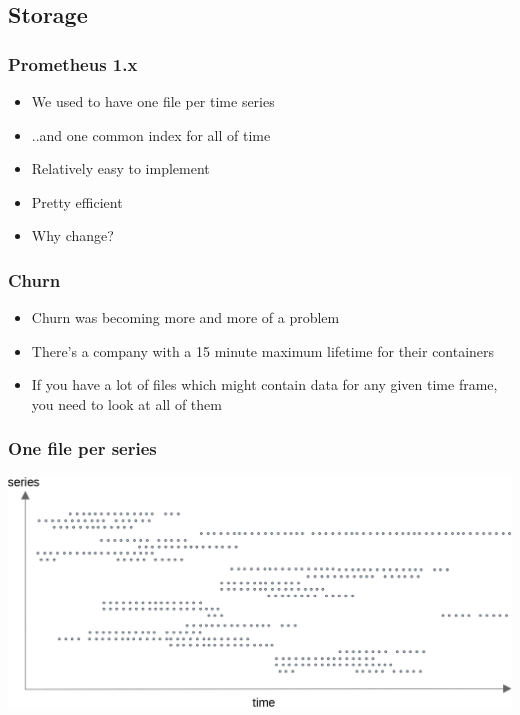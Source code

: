 \documentclass[aspectratio=169]{beamer}
\begin{document}
\subsection{Storage}

\begin{frame}
	\frametitle{Prometheus 1.x}
	\begin{itemize}
		\item We used to have one file per time series
		\item ..and one common index for all of time
		\item Relatively easy to implement
		\item Pretty efficient
		\item Why change?
	\end{itemize}
\end{frame}

\begin{frame}
	\frametitle{Churn}
	\begin{itemize}
		\item Churn was becoming more and more of a problem
		\item There's a company with a 15 minute maximum lifetime for their containers
		\item If you have a lot of files which might contain data for any given time frame, you need to look at all of them
	\end{itemize}
\end{frame}


\begin{frame}
	\frametitle{One file per series}
	\includegraphics[width=\textwidth]{storage--file_per_series.png}
\end{frame}
\end{document}
